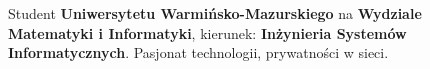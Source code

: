 \documentclass[9pt]{developercv} %
\begin{document}
\vspace{0.5cm}



\begin{minipage}[t]{0.4\textwidth} %
    \vspace{-\baselineskip} %

    Student \textbf{Uniwersytetu Warmińsko-Mazurskiego} na \textbf{Wydziale Matematyki i Informatyki}, kierunek: \textbf{Inżynieria Systemów Informatycznych}. Pasjonat technologii, prywatności w sieci.\\ %
\end{minipage}
\hfill %
\begin{minipage}[t]{0.5\textwidth} %
    \vspace{-\baselineskip} %
    \begin{barchart}{5.5}
    \end{barchart}
\end{minipage}

\begin{center}
\end{center}


\end{document}
